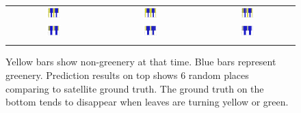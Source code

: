 \begin{figure}
\begin{center}
\hspace{-10pt}
\begin{tabular}{ccc}
\includegraphics[width=0.17\textwidth]{bar/8560.jpg} &
\hspace{-20pt}
\includegraphics[width=0.17\textwidth]{bar/8561.jpg} &
\hspace{-20pt}
\includegraphics[width=0.17\textwidth]{bar/8881.jpg} \\
\includegraphics[width=0.17\textwidth]{bar/8911.jpg} &
\hspace{-20pt}
\includegraphics[width=0.17\textwidth]{bar/9705.jpg} &
\hspace{-20pt}
\includegraphics[width=0.17\textwidth]{bar/10816.jpg} \\
\\
\end{tabular}
\end{center}
\vspace{-24pt}
\caption{Yellow bars show non-greenery at that time. Blue bars represent greenery. Prediction results on top shows 6 random places comparing to satellite ground truth. The ground truth on the bottom tends to disappear when leaves are turning yellow or green.}
\label{fig:placeinbar}
\vspace{-12pt}
\end{figure}


